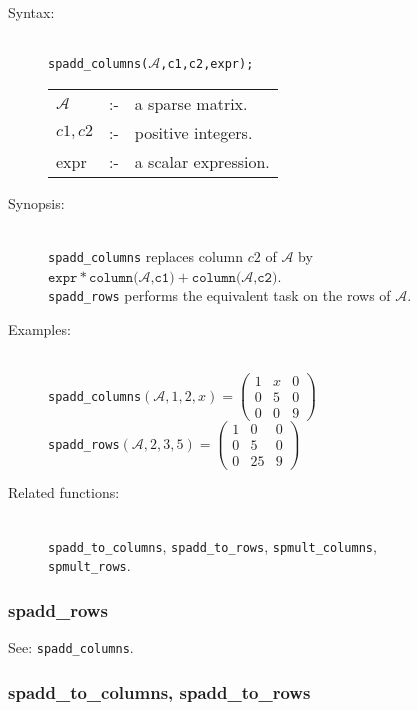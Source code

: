 \begin{description}
\item[Syntax:]\mbox{}\\
\texttt{spadd\_columns($\mathcal{A}$,c1,c2,expr);}

\begin{tabular}{l l l}
$\mathcal{A}$ & :- & a sparse matrix. \\
$c1,c2$      & :- & positive integers. \\
expr       & :- & a scalar expression.
\end{tabular}

\item[Synopsis:]\mbox{}\\
\texttt{spadd\_columns} replaces column $c2$ of $\mathcal{A}$ by\\
$\texttt{expr} * \texttt{column($\mathcal{A}$,c1)} + \texttt{column($\mathcal{A}$,c2)}$.\\
\texttt{spadd\_rows} performs the equivalent task on the rows of $\mathcal{A}$.

\item[Examples:]\mbox{}\\
\texttt{spadd\_columns}\((\mathcal{A},1,2,x)  =
  \begin{pmatrix} 1 & x & 0 \\ 0 & 5 & 0 \\ 0 & 0 & 9 \end{pmatrix}\) \\[2mm]
\texttt{spadd\_rows}\((\mathcal{A},2,3,5)  =
\begin{pmatrix} 1 & 0 & 0 \\ 0 & 5 & 0 \\ 0 & 25 & 9 \end{pmatrix}\)

\item[Related functions:]\mbox{}\\
\texttt{spadd\_to\_columns}, \texttt{spadd\_to\_rows},
\texttt{spmult\_columns},\\ \texttt{spmult\_rows}.
\end{description}

\subsubsection{spadd\_rows}
\label{sparse:spadd_rows}
\hypertarget{operator:SPADD_ROWS}{}

See: \texttt{spadd\_columns}.


\subsubsection{spadd\_to\_columns, spadd\_to\_rows}
\label{sparse:spadd_to_columns}
\hypertarget{operator:SPADD_TO_COLUMNS}{}

